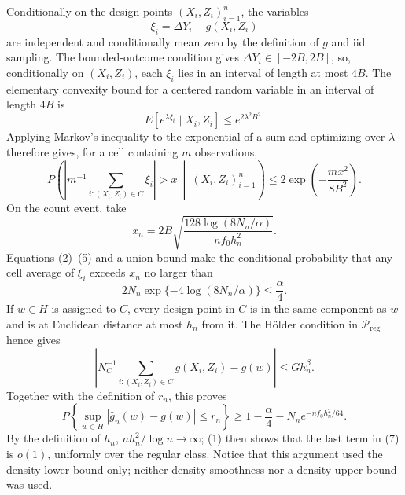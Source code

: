 Conditionally on the design points \((X_i,Z_i)_{i=1}^n\), the variables
\[
 \xi_i=\Delta Y_i-g(X_i,Z_i)
\]
are independent and conditionally mean zero by the definition of \(g\) and iid sampling.  The bounded-outcome condition gives \(\Delta Y_i\in[-2B,2B]\), so, conditionally on \((X_i,Z_i)\), each \(\xi_i\) lies in an interval of length at most \(4B\).  The elementary convexity bound for a centered random variable in an interval of length \(4B\) is
\[
 E[e^{\lambda\xi_i}\mid X_i,Z_i]\le e^{2\lambda^2B^2}.
\]
Applying Markov's inequality to the exponential of a sum and optimizing over \(\lambda\) therefore gives, for a cell containing \(m\) observations,
\[
 P\!\left(\left|m^{-1}\sum_{i:(X_i,Z_i)\in C}\xi_i\right|>x
       \ \middle|\ (X_i,Z_i)_{i=1}^n\right)
 \le 2\exp\!\left(-\frac{mx^2}{8B^2}\right).                                  \tag{5}
\]
On the count event, take
\[
 x_n=2B\sqrt{\frac{128\log(8N_n/\alpha)}{nf_0h_n^2}}.
\]
Equations (2)--(5) and a union bound make the conditional probability that any cell average of \(\xi_i\) exceeds \(x_n\) no larger than
\[
 2N_n\exp\{-4\log(8N_n/\alpha)\}\le \frac{\alpha}{4}.                         \tag{6}
\]
If \(w\in H\) is assigned to \(C\), every design point in \(C\) is in the same component as \(w\) and is at Euclidean distance at most \(h_n\) from it.  The H\"older condition in \(\mathcal P_{\mathrm{reg}}\) hence gives
\[
 \left|N_C^{-1}\sum_{i:(X_i,Z_i)\in C}g(X_i,Z_i)-g(w)\right|\le Gh_n^\beta.
\]
Together with the definition of \(r_n\), this proves
\[
 P\!\left\{\sup_{w\in H}|\widehat g_n(w)-g(w)|\le r_n\right\}
 \ge 1-\frac{\alpha}{4}-N_ne^{-nf_0h_n^2/64}.                                   \tag{7}
\]
By the definition of \(h_n\), \(nh_n^2/\log n\to\infty\); (1) then shows that the last term in (7) is \(o(1)\), uniformly over the regular class.  Notice that this argument used the density lower bound only; neither density smoothness nor a density upper bound was used.

